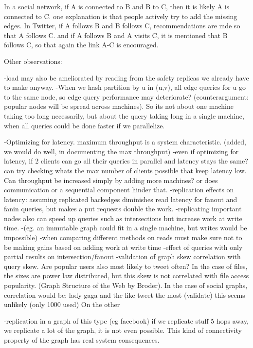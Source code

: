 \documentclass{article}
\begin{document}
In a social network, if A is connected to B and B to C, then it is likely A is connected to C. one explanation is
that people actively try to add the missing edges.  In Twitter, if A follows B and B follows C, recommendations are mde
so that A follows C. and if A follows B and A visits C, it is mentioned that B follows C, so that again the link A-C is encouraged.


Other observations:

-load may also be ameliorated by reading from the safety replicas we already have to make anyway.
-When we hash partition by u in (u,v), all edge queries for  u go to the same node, so edge query performance may deteriorate?
(counterargument: popular nodes will be spread across machines). So its not about one machine taking too long necessarily, but
about the query taking long in a single machine, when all queries could be done faster if we parallelize.


-Optimizing for latency. maximum throughput is a system characteristic. (added, we would do well, in documenting the max throughput) 
-even if optimizing for latency, if 2 clients can go all their queries in parallel and latency stays the same? can try checking whats the max number
of clients possible that keep latency low. Can throughput be increased simply by adding more machines? or does communication or a sequential component hinder that.
-replication effects on latency: assuming replicated backedges diminishes read latency for fanout and fanin queries, but makes a put requests double the work.
-replicating important  nodes also can speed up queries such as intersections but increase work at write time.
-(eg. an immutable graph could fit in a single machine, but writes would be impossible)
-when comparing different methods on reads must make sure not to be making gains based on adding work at write time
-effect of queries with only partial results on intersection/fanout
-validation of graph skew correlation with query skew. Are popular users also most likely to tweet often?  In the case of files,
the sizes are power law distributed, but this skew is not correlated with file access popularity. (Graph Structure of the Web by Broder).
In the case of social graphs, correlation would be: lady gaga and the like tweet the most (validate) this seems unlikely (only 1000 used)
On the other 

-replication in a graph of this type (eg facebook) if we replicate stuff 5 hops away, we replicate a lot of the graph, it is not even possible.
This kind of connectivity property of the graph has real system consequences.   
\end{document}
